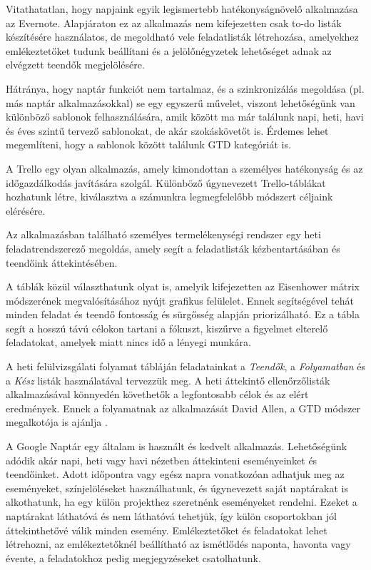 
Vitathatatlan, hogy napjaink egyik legismertebb hatékonyságnövelő alkalmazása az Evernote. Alapjáraton ez az alkalmazás nem kifejezetten csak to-do listák készítésére használatos, de megoldható vele feladatlisták létrehozása, amelyekhez emlékeztetőket tudunk beállítani és a jelölőnégyzetek lehetőséget adnak az elvégzett teendők megjelölésére.

Hátránya, hogy naptár funkciót nem tartalmaz, és a szinkronizálás megoldása (pl. más naptár alkalmazásokkal) se egy egyszerű művelet, viszont lehetőségünk van különböző sablonok felhasználására, amik között ma már találunk napi, heti, havi és éves szintű tervező sablonokat, de akár szokáskövetőt is. Érdemes lehet megemlíteni, hogy a sablonok között találunk GTD kategóriát is.


A Trello egy olyan alkalmazás, amely kimondottan a személyes hatékonyság és az időgazdálkodás javítására szolgál. Különböző úgynevezett Trello-táblákat hozhatunk létre, kiválasztva a számunkra legmegfelelőbb módszert céljaink elérésére.

Az alkalmazásban található személyes termelékenységi rendszer egy heti feladatrendszerező megoldás, amely segít a feladatlisták kézbentartásában és teendőink áttekintésében.

A táblák közül választhatunk olyat is, amelyik kifejezetten az Eisenhower mátrix módszerének megvalósításához nyújt grafikus felülelet. Ennek segítségével tehát minden feladat és teendő fontosság és sürgősség alapján priorizálható. Ez a tábla segít a hosszú távú célokon tartani a fókuszt, kiszűrve a figyelmet elterelő feladatokat, amelyek miatt nincs idő a lényegi munkára.

A heti felülvizsgálati folyamat tábláján feladatainkat a \textit{Teendők}, a \textit{Folyamatban} és a \textit{Kész} listák használatával tervezzük meg. A heti áttekintő ellenőrzőlisták alkalmazásával könnyedén követhetők a legfontosabb célok és az elért eredmények. Ennek a folyamatnak az alkalmazását David Allen, a GTD módszer megalkotója is ajánlja \cite{trello}.


A Google Naptár egy általam is használt és kedvelt alkalmazás. Lehetőségünk adódik akár napi, heti vagy havi nézetben áttekinteni eseményeinket és teendőinket. Adott időpontra vagy egész napra vonatkozóan adhatjuk meg az eseményeket, színjelöléseket használhatunk, és úgynevezett saját naptárakat is alkothatunk, ha egy külön projekthez szeretnénk eseményeket rendelni. Ezeket a naptárakat láthatóvá és nem láthatóvá tehetjük, így külön csoportokban jól áttekinthetővé válik minden esemény. Emlékeztetőket és feladatokat lehet létrehozni, az emlékeztetőknél beállítható az ismétlődés naponta, havonta vagy évente, a feladatokhoz pedig megjegyzéseket csatolhatunk.

